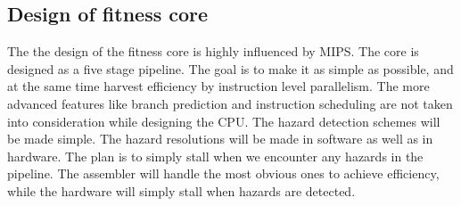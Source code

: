 \subsection{Design of fitness core}

The the design of the fitness core is highly influenced by MIPS. The core is designed as a five stage pipeline. The goal is to make it as simple as possible, and at the same time harvest efficiency by instruction level parallelism. The more advanced features like branch prediction and instruction scheduling are not taken into consideration while designing the CPU. The hazard detection schemes will be made simple. The hazard resolutions will be made in software as well as in hardware. The plan is to simply stall when we encounter any hazards in the pipeline. The assembler will handle the most obvious ones to achieve efficiency, while the hardware will simply stall when hazards are detected. 




